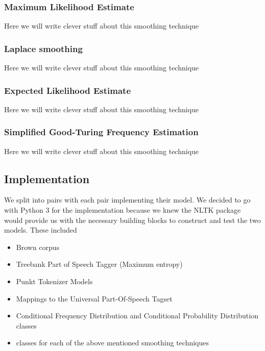 \documentclass[a4paper,12pt]{article}
\begin{document}
\subsubsection{Maximum Likelihood Estimate}
Here we will write clever stuff about this smoothing technique

\subsubsection{Laplace smoothing}
Here we will write clever stuff about this smoothing technique

\subsubsection{Expected Likelihood Estimate}
Here we will write clever stuff about this smoothing technique

\subsubsection{Simplified Good-Turing Frequency Estimation}
Here we will write clever stuff about this smoothing technique


\subsection{Implementation}
\label{sec:impl}

We split into pairs with each pair implementing their model. We decided to go with Python 3 for the implementation because we knew the NLTK package would provide us with the necessary building blocks to construct and test the two models. These included
\begin{itemize}
\item Brown corpus
\item Treebank Part of Speech Tagger (Maximum entropy)
\item Punkt Tokenizer Models
\item Mappings to the Universal Part-Of-Speech Tagset
\item Conditional Frequency Distribution and Conditional Probability Distribution classes
\item classes for each of the above mentioned smoothing techniques
\end{itemize}







\end{document}
